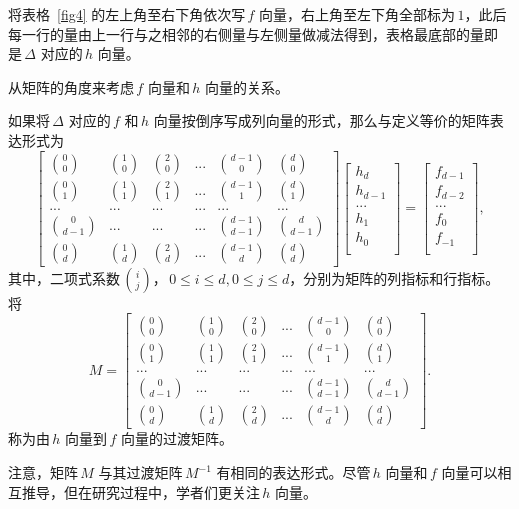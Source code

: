 将表格 \,\ref{fig4} 的左上角至右下角依次写\,$f$ 向量，右上角至左下角全部标为\,$1$，此后每一行的量由上一行与之相邻的右侧量与左侧量做减法得到，表格最底部的量即是\,$\Delta$ 对应的\,$h$ 向量。

从矩阵的角度来考虑\,$f$ 向量和\,$h$ 向量的关系。
\begin{theoreminner}
如果将\,$\Delta$ 对应的\,$f$ 和\,$h$ 向量按倒序写成列向量的形式，那么与定义等价的矩阵表达形式为
\begin{equation}  \label{eq3.12}
\left[
\begin{array}{cccccc} %
\binom{0}{0} & \binom{1}{0} & \binom{2}{0} & ... & \binom{d-1}{0} & \binom{d}{0} \\ %
\binom{0}{1} & \binom{1}{1} & \binom{2}{1} & ... & \binom{d-1}{1} & \binom{d}{1} \\ %
... & ... & ... & ... & ... & ... \\ %
\binom{0}{d-1} & ... & ... & ... & \binom{d-1}{d-1} & \binom{d}{d-1} \\ %
\binom{0}{d} & \binom{1}{d} & \binom{2}{d} & ... & \binom{d-1}{d} & \binom{d}{d}    %
\end{array}
\right]
\left[
\begin{array}{ccccc}
h_{d}\\
h_{d-1}\\
... \\
h_{1} \\
h_{0} \\
\end{array}
\right]=
\left[
\begin{array}{ccccc}
f_{d-1}\\
f_{d-2}\\
... \\
f_{0} \\
f_{-1} \\
\end{array}
\right],
\end{equation}
其中，二项式系数\,$\binom{i}{j}$，\,$0\leq i\leq d, 0\leq j\leq d$，分别为矩阵的列指标和行指标。将
\begin{equation}  \label{eq3.12}
M=\left[
\begin{array}{cccccc} %
\binom{0}{0} & \binom{1}{0} & \binom{2}{0} & ... & \binom{d-1}{0} & \binom{d}{0} \\ %
\binom{0}{1} & \binom{1}{1} & \binom{2}{1} & ... & \binom{d-1}{1} & \binom{d}{1} \\ %
... & ... & ... & ... & ... & ... \\ %
\binom{0}{d-1} & ... & ... & ... & \binom{d-1}{d-1} & \binom{d}{d-1} \\ %
\binom{0}{d} & \binom{1}{d} & \binom{2}{d} & ... & \binom{d-1}{d} & \binom{d}{d}    %
\end{array}
\right].
\end{equation}
称为由\,$h$ 向量到\,$f$ 向量的过渡矩阵。
\end{theoreminner}
注意，矩阵\,$M$ 与其过渡矩阵\,$M^{-1}$ 有相同的表达形式。尽管\,$h$ 向量和\,$f$ 向量可以相互推导，但在研究过程中，学者们更关注\,$h$ 向量。

